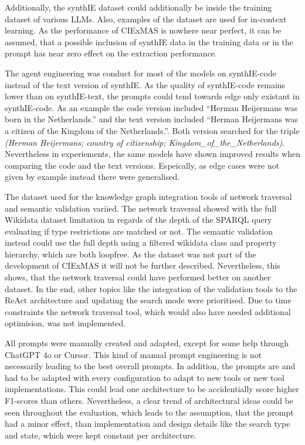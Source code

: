 \documentclass[a4paper,oneside,bibliography=totoc]{scrbook}
\begin{document}
Additionally, the synthIE dataset could additionally be inside the training dataset of various \acp{LLM}. Also, examples of the dataset are used for in-context learning. As the performance of CIExMAS is nowhere near perfect, it can be assumed, that a possible inclusion of synthIE data in the training data or in the prompt has near zero effect on the extraction performance.

The agent engineering was conduct for most of the models on synthIE-code instead of the text version of synthIE. As the quality of synthIE-code remains lower than on synthIE-text, the prompts could tend towards edge only existant in synthIE-code. As an example the code version included \enquote{Herman Heijermans was born in the Netherlands.} and the text version included \enquote{Herman Heijermans was a citizen of the Kingdom of the Netherlands.}. Both version searched for the triple \textit{(Herman Heijermans; country of citizenship; Kingdom\_of\_the\_Netherlands)}. Nevertheless in experiements, the same models have shown improved results when comparing the code and the text versions. Espeically, as edge cases were not given by example instead there were generalised.

The dataset used for the knowledge graph integration tools of network traversal and semantic validation variied. The network traversal showed with the full Wikidata dataset limitation in regards of the depth of the SPARQL query evaluating if type restrictions are matched or not. The semantic validation instead could use the full depth using a filtered wikidata class and property hierarchy, which are both loopfree. As the dataset was not part of the development of CIExMAS it will not be further described. Nevertheless, this shows, that the network traversal could have performed better on another dataset. In the end, other topics like the integration of the validation tools to the ReAct architecture and updating the search mode were prioritised. Due to time constraints the network traversal tool, which would also have needed additional optimision, was not implemented.

All prompts were manually created and adapted, except for some help through ChatGPT 4o or Cursor. This kind of manual prompt engineering is not necessarily leading to the best overall prompts. In addition, the prompts are and had to be adapted with every configuration to adapt to new tools or new tool implementations. This could lead one architecture to be accidentially score higher F1-scores than others. Nevertheless, a clear trend of architectural ideas could be seen throughout the evaluation, which leads to the assumption, that the prompt had a minor effect, than implementation and design details like the search type and state, which were kept constant per architecture.
\end{document}
